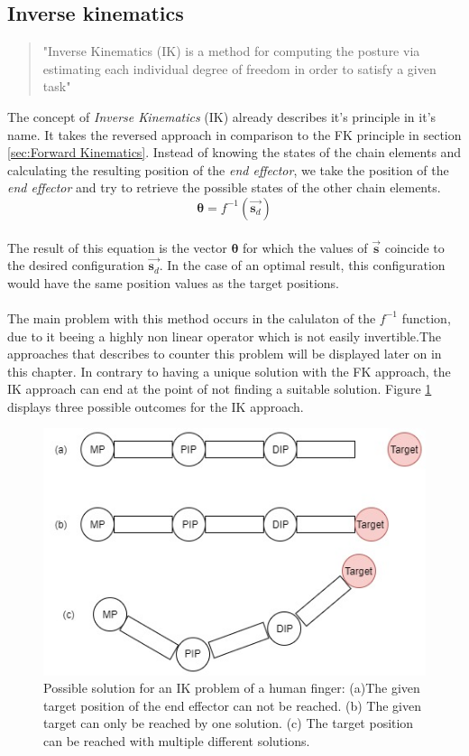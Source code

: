 \subsection{Inverse kinematics}
\label{sec:inverse kinematics}
\begin{quote}"Inverse Kinematics (IK) is a method for computing the posture via estimating each individual degree of freedom in order to satisfy a given task" \cite{AndreasAristidouandJoanLasenby.2009}\end{quote}
The concept of \textit{Inverse Kinematics}  (IK) already describes it's principle in it's name. It takes the reversed approach in comparison to the FK principle in section \ref{sec:Forward Kinematics}. Instead of knowing the states of the chain elements and calculating the resulting position of the \textit{end effector}, we take the position of the \textit{end effector} and try to retrieve the possible states of the other chain elements. \\
\begin{equation}
\label{ik problem formula}
\pmb{\theta}=f^{-1}(\vec{\textbf{s}_{d}})
\end{equation}
\\The result of this equation is the vector $\pmb{\theta}$ for which the values of $\vec{\textbf{s}}$ coincide to the desired configuration $\vec{\textbf{s}_{d}}$. In the case of an optimal result, this configuration would have the same position values as the target positions.\\\\ The main problem with this method occurs in the calulaton of the $f^{-1}$ function, due to it beeing a highly non linear operator which is not easily invertible.The approaches that \cite{AndreasAristidouandJoanLasenby.2009} describes to counter this problem will be displayed later on in this chapter.
In contrary to having a unique solution with the FK approach, the IK approach can end at the point of not finding a suitable solution. Figure \ref{IkSolutions} displays three possible outcomes for the IK approach.
\begin{figure}[H]
\centering
\includegraphics[scale=0.6]{images/Ik_figure.jpg}
\caption{Possible solution for an IK problem of a human finger: (a)The given target position of the end effector can not be reached. (b) The given target can only be reached by one solution. (c) The target position can be reached with multiple different solutions.}
\label{IkSolutions}
\end{figure}
